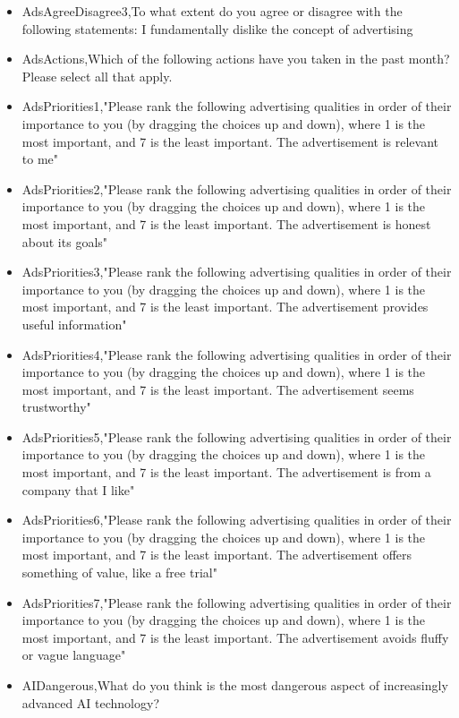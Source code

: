 \begin{appendices}
\begin{itemize}
        \item AdsAgreeDisagree3,To what extent do you agree or disagree with the following statements: I fundamentally dislike the concept of advertising
        \item AdsActions,Which of the following actions have you taken in the past month? Please select all that apply.
        \item AdsPriorities1,"Please rank the following advertising qualities in order of their importance to you (by dragging the choices up and down), where 1 is the most important, and 7 is the least important. The advertisement is relevant to me"
        \item AdsPriorities2,"Please rank the following advertising qualities in order of their importance to you (by dragging the choices up and down), where 1 is the most important, and 7 is the least important. The advertisement is honest about its goals"
        \item AdsPriorities3,"Please rank the following advertising qualities in order of their importance to you (by dragging the choices up and down), where 1 is the most important, and 7 is the least important. The advertisement provides useful information"
        \item AdsPriorities4,"Please rank the following advertising qualities in order of their importance to you (by dragging the choices up and down), where 1 is the most important, and 7 is the least important. The advertisement seems trustworthy"
        \item AdsPriorities5,"Please rank the following advertising qualities in order of their importance to you (by dragging the choices up and down), where 1 is the most important, and 7 is the least important. The advertisement is from a company that I like"
        \item AdsPriorities6,"Please rank the following advertising qualities in order of their importance to you (by dragging the choices up and down), where 1 is the most important, and 7 is the least important. The advertisement offers something of value, like a free trial"
        \item AdsPriorities7,"Please rank the following advertising qualities in order of their importance to you (by dragging the choices up and down), where 1 is the most important, and 7 is the least important. The advertisement avoids fluffy or vague language"
        \item AIDangerous,What do you think is the most dangerous aspect of increasingly advanced AI technology?

\end{itemize}
\end{appendices}
